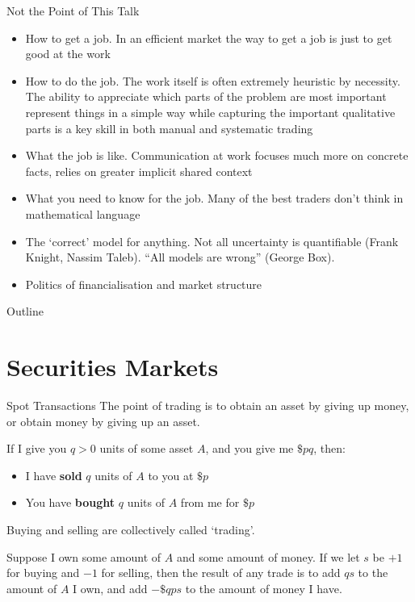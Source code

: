 \documentclass{beamer}
\newcommand{\sectionquote}[1]{\def\insertsquote{#1}}
\newcommand{\insertsquote}{}
\renewcommand{\insertsquote}{}
\begin{document}
\begin{frame}{Not the Point of This Talk}
	\begin{itemize}
		\item How to get a job. In an efficient market the way to get a job is just to get good at the work
		\item How to do the job. The work itself is often extremely heuristic by necessity. The ability to appreciate which parts of the problem are most important represent things in a simple way while capturing the important qualitative parts is a key skill in both manual and systematic trading
		\item What the job is like. Communication at work focuses much more on concrete facts, relies on greater implicit shared context
		\item What you need to know for the job. Many of the best traders don't think in mathematical language
		\item The `correct' model for anything. Not all uncertainty is quantifiable (Frank Knight, Nassim Taleb). ``All models are wrong'' (George Box).
		\item Politics of financialisation and market structure
	\end{itemize}

\end{frame}
\begin{frame}{Outline}
	\tableofcontents
\end{frame}

\sectionquote{``Governing by the power of virtue can be compared to the pole star, which remains fixed in place while all the other stars orbit respectfully around it.'' Confucius}
\section{Securities Markets}

\begin{frame}{Spot Transactions}
	The point of trading is to obtain an asset by giving up money, or obtain money by giving up an asset.

	If I give you $q>0$ units of some asset $A$, and you give me $\$pq$, then:%
	\begin{itemize}
		\item I have \textbf{sold} $q$ units of $A$ to you at $\$p$
		\item You have \textbf{bought} $q$ units of $A$ from me for $\$p$
	\end{itemize} %

	Buying and selling are collectively called `trading'.%

	Suppose I own some amount of $A$ and some amount of money. If we let $s$ be $+1$ for buying and $-1$ for selling, then the result of any trade is to add $qs$ to the amount of $A$ I own, and add $-\$qps$ to the amount of money I have. %
\end{frame}
\end{document}
